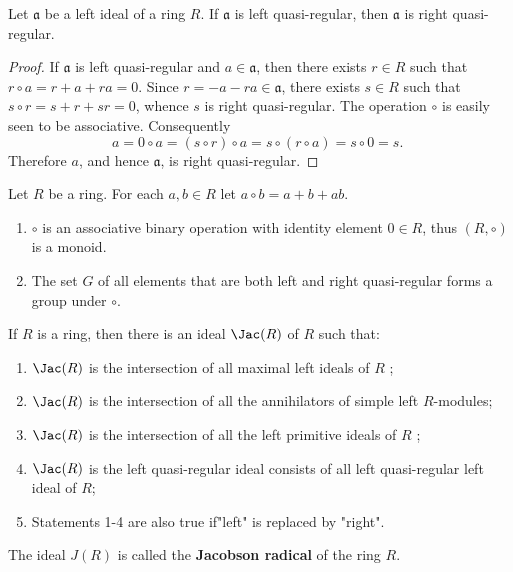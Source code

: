 \begin{lemma}
    \label{lem: left quasi-regular left ideal is right quasi-regular.}
    Let $\mathfrak{a}$ be a left ideal of a ring $R$.
    If $\mathfrak{a}$ is left quasi-regular, then $\mathfrak{a}$ is right quasi-regular.
    \begin{proof}
        If $\mathfrak{a}$ is left quasi-regular and $a \in \mathfrak{a}$, then there exists $r \in R$ such that $r \circ a=r+a+r a=0$. Since $r=-a-r a \in \mathfrak{a}$, there exists $s \in R$ such that $s \circ r=s+r+s r=0$, whence $s$ is right quasi-regular. The operation $\circ$ is easily seen to be associative. Consequently
        \begin{equation*}
            a=0 \circ a=(s \circ r) \circ a=s \circ(r \circ a)=s \circ 0=s \text {. }
        \end{equation*}
        Therefore $a$, and hence $\mathfrak{a}$, is right quasi-regular.
    \end{proof}
\end{lemma}

\begin{proposition}
    Let $R$ be a ring. For each $a, b \in R$ let $a \circ b=a+b+a b$.
    \begin{enumerate}
        \item
              $\circ$ is an associative binary operation with identity element $0 \in R$, thus $\left(R,\circ\right)$ is a monoid.
        \item
              The set $G$ of all elements that are both left and right quasi-regular forms a group under $\circ$.
    \end{enumerate}
\end{proposition}




\begin{theorem}
    \label{thm: Jacobson radical}
    If $R$ is a ring, then there is an ideal $\Jac(R)$ of $R$ such that:
    \begin{enumerate}
        \item
              $\Jac(R)$ is the intersection of all maximal left ideals of $R$ ;
        \item
              $\Jac(R)$ is the intersection of all the annihilators of simple left $R$-modules;
        \item
              $\Jac(R)$ is the intersection of all the left primitive ideals of $R$ ;

        \item
              $\Jac(R)$ is the left quasi-regular ideal consists of all left quasi-regular left ideal of $R$;

        \item
              Statements 1-4 are also true if"left" is replaced by "right".
    \end{enumerate}
    The ideal $J(R)$ is called the \textbf{Jacobson radical} of the ring $R$.
\end{theorem}



